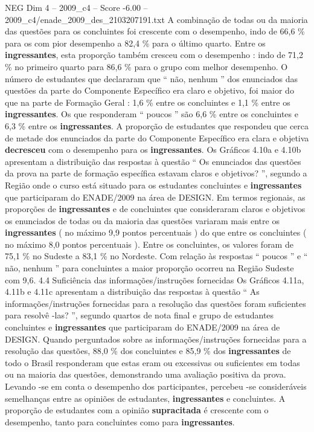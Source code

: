 \begin{textsample}{NEG Dim 4 – 2009\_c4 – Score -6.00 – 2009\_c4/enade\_2009\_des\_2103207191.txt}
A combinação de todas ou da maioria das questões para os concluintes foi crescente com o desempenho, indo de 66,6 \% para os com pior desempenho a 82,4 \% para o último quarto.
Entre os \textbf{ingressantes}, esta proporção também cresceu com o desempenho : indo de 71,2 \% no primeiro quarto para 86,6 \% para o grupo com melhor desempenho.
O número de estudantes que declararam que “ não, nenhum ” dos enunciados das questões da parte do Componente Específico era claro e objetivo, foi maior do que na parte de Formação Geral : 1,6 \% entre os concluintes e 1,1 \% entre os \textbf{ingressantes}.
Os que responderam “ poucos ” são 6,6 \% entre os concluintes e 6,3 \% entre os \textbf{ingressantes}.
A proporção de estudantes que respondeu que cerca de metade dos enunciados da parte do Componente Específico era clara e objetiva \textbf{decresceu} com o desempenho para os \textbf{ingressantes}.
Os Gráficos 4.10a e 4.10b apresentam a distribuição das respostas à questão “ Os enunciados das questões da prova na parte de formação específica estavam claros e objetivos? ”, segundo a Região onde o curso está situado para os estudantes concluintes e \textbf{ingressantes} que participaram do ENADE/2009 na área de DESIGN.
Em termos regionais, as proporções de \textbf{ingressantes} e de concluintes que consideraram claros e objetivos os enunciados de todas ou da maioria das questões variaram mais entre os \textbf{ingressantes} ( no máximo 9,9 pontos percentuais ) do que entre os concluintes ( no máximo 8,0 pontos percentuais ).
Entre os concluintes, os valores foram de 75,1 \% no Sudeste a 83,1 \% no Nordeste.
Com relação às respostas “ poucos ” e “ não, nenhum ” para concluintes a maior proporção ocorreu na Região Sudeste com 9,6. 4.4 Suficiência das informações/instruções fornecidas Os Gráficos 4.11a, 4.11b e 4.11c apresentam a distribuição das respostas à questão “ As informações/instruções fornecidas para a resolução das questões foram suficientes para resolvê -las? ”, segundo quartos de nota final e grupo de estudantes concluintes e \textbf{ingressantes} que participaram do ENADE/2009 na área de DESIGN.
Quando perguntados sobre as informações/instruções fornecidas para a resolução das questões, 88,0 \% dos concluintes e 85,9 \% dos \textbf{ingressantes} de todo o Brasil responderam que estas eram ou excessivas ou suficientes em todas ou na maioria das questões, demonstrando uma avaliação positiva da prova.
Levando -se em conta o desempenho dos participantes, percebeu -se consideráveis semelhanças entre as opiniões de estudantes, \textbf{ingressantes} e concluintes.
A proporção de estudantes com a opinião \textbf{supracitada} é crescente com o desempenho, tanto para concluintes como para \textbf{ingressantes}.

\end{textsample}
